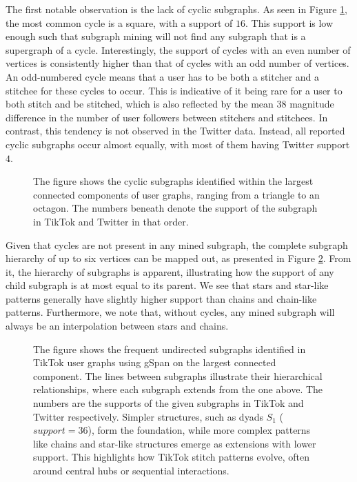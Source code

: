 The first notable observation is the lack of cyclic subgraphs. As seen in Figure \ref{fig:cycle_subgraphs}, the most common cycle is a square, with a support of $16$. This support is low enough such that subgraph mining will not find any subgraph that is a supergraph of a cycle. Interestingly, the support of cycles with an even number of vertices is consistently higher than that of cycles with an odd number of vertices. An odd-numbered cycle means that a user has to be both a stitcher and a stitchee for these cycles to occur. This is indicative of it being rare for a user to both stitch and be stitched, which is also reflected by the mean $38$ magnitude difference in the number of user followers between stitchers and stitchees. In contrast, this tendency is not observed in the Twitter data. Instead, all reported cyclic subgraphs occur almost equally, with most of them having Twitter support $4$. 

\begin{figure}[!htbp]
    \centering
    
    \caption{The figure shows the cyclic subgraphs identified within the largest connected components of user graphs, ranging from a triangle to an octagon. The numbers beneath denote the support of the subgraph in TikTok and Twitter in that order.}
    \label{fig:cycle_subgraphs}
\end{figure}


Given that cycles are not present in any mined subgraph, the complete subgraph hierarchy of up to six vertices can be mapped out, as presented in Figure \ref{fig:subgraph_hierarchy}. From it, the hierarchy of subgraphs is apparent, illustrating how the support of any child subgraph is at most equal to its parent. We see that stars and star-like patterns generally have slightly higher support than chains and chain-like patterns. Furthermore, we note that, without cycles, any mined subgraph will always be an interpolation between stars and chains.

\begin{figure}[!htbp]
    \centering
    
    \caption{The figure shows the frequent undirected subgraphs identified in TikTok user graphs using gSpan on the largest connected component. The lines between subgraphs illustrate their hierarchical relationships, where each subgraph extends from the one above. The numbers are the supports of the given subgraphs in TikTok and Twitter respectively. Simpler structures, such as dyads $S_1$ ($support=36$), form the foundation, while more complex patterns like chains and star-like structures emerge as extensions with lower support. This highlights how TikTok stitch patterns evolve, often around central hubs or sequential interactions.}
    \label{fig:subgraph_hierarchy}
\end{figure}

